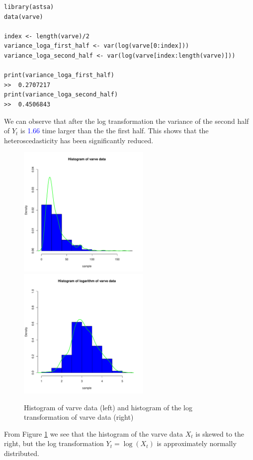 \documentclass[11pt, oneside]{article}   	%
\begin{document}
\begin{lstlisting}
library(astsa)
data(varve)

index <- length(varve)/2
variance_loga_first_half <- var(log(varve[0:index]))
variance_loga_second_half <- var(log(varve[index:length(varve)]))

print(variance_loga_first_half)
>>  0.2707217
print(variance_loga_second_half)
>>  0.4506843
\end{lstlisting}
\begin{flushleft}
We can observe that after the log transformation the variance of the second half of $Y_{t}$ is \textcolor{blue}{1.66} time larger than the the first half. This shows that the heteroscedasticity has been significantly reduced.
\end{flushleft}
\begin{figure}[H] %
   \centering
   \includegraphics[width=2.5in]{hist_x} 
   \includegraphics[width=2.5in]{hist_log}
   \caption{Histogram of varve data (left) and histogram of the log transformation of varve data (right)}
   \label{fig:hist}
\end{figure}
From Figure \ref{fig:hist} we see that the histogram of the varve data $X_{t}$ is skewed to the right, but the log transformation $Y_{t} = \log(X_{t})$ is approximately normally distributed.
\end{document}

